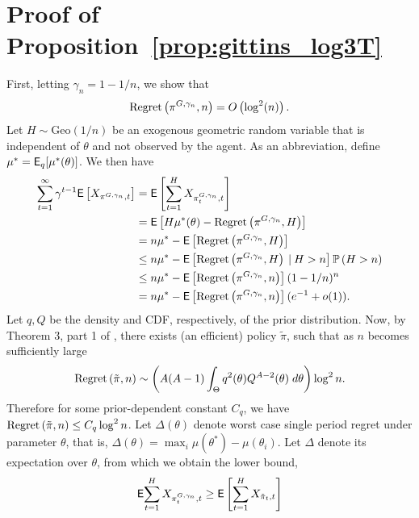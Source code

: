 \appendix

\section{Proof of Proposition~\ref{prop:gittins_log3T}} \label{proof:prop_log3T}
\begin{myproof}[Proof.]
	First, letting $\gamma_n = 1 - 1/n$, we show that
	\begin{equation} \label{eq:basic_finite_time_gittins}
	\textnormal{Regret} \left( \pi^{G, \gamma_n}, n \right) = O\left( \log^2(n) \right).
	\end{equation}
	Let $H \sim \text{Geo}(1/n)$ be an exogenous geometric random variable that is independent of $\theta$ and not observed by the agent. As an abbreviation, define $\mu^* = \mathsf{E}_{q}[\mu^*(\theta)]$. We then have
	\begin{align}
	\sum_{t=1}^\infty \gamma^{t-1} \mathsf{E}\left[X_{\pi^{G,\gamma_n},t}\right] & = \mathsf{E}\left[\sum_{t=1}^H X_{\pi^{G,\gamma_n}_t,t}\right] \nonumber \\
	& =  \mathsf{E}\left[H \mu^*(\theta) -\textnormal{Regret} \left( \pi^{G,\gamma_n}, H \right)\right] \\
	& =  n \mu^* - \mathsf{E}\left[\textnormal{Regret} \left( \pi^{G,\gamma_n}, H \right)\right] \nonumber \\
	& \le n \mu^* - \mathsf{E}\left[\textnormal{Regret} \left( \pi^{G,\gamma_n}, H \right) \:\vert\: H > n\right]\mathbb{P} \left( H > n \right) \nonumber \\
	& \le n \mu^* - \mathsf{E}\left[\textnormal{Regret} \left( \pi^{G,\gamma_n}, n \right)\right](1-1/n)^n \nonumber \\
	& = n \mu^* - \mathsf{E}\left[\textnormal{Regret} \left( \pi^{G,\gamma_n}, n \right)\right](e^{-1} + o(1)) \label{bound:geometric_regret1}.
	\end{align}
	Let $q, Q$ be the density and CDF, respectively, of the prior distribution. Now, by Theorem 3, part 1 of \cite{lai1987adaptive}, there exists (an efficient) policy $\tilde \pi$, such that as $n$ becomes sufficiently large
	\begin{equation*}
	\textnormal{Regret} \left( \tilde \pi, n \right) \sim \left( A(A-1)  \int_\Theta q^2(\theta) Q^{A-2}(\theta) \; d\theta \right) \log^2 n.
	\end{equation*}
	Therefore for some prior-dependent constant $C_q$, we have $\textnormal{Regret} \left( \tilde \pi, n \right) \le C_q \log^2 n$. Let $\Delta(\theta)$ denote worst case  single period regret under parameter $\theta$, that is, $\Delta(\theta) =  \max_{i} \mu(\theta^*) - \mu(\theta_i)$. Let $\Delta$ denote its expectation over $\theta$, from which we obtain the lower bound,
	\begin{align}
	\E{\sum_{t=1}^H X_{\pi^{G,\gamma_n}_t,t}} & \ge \E\left[\sum_{t=1}^H X_{ \tilde \pi_t,t}\right] \label{bound:gittins_optimality}\\

\end{align}
\end{myproof}
